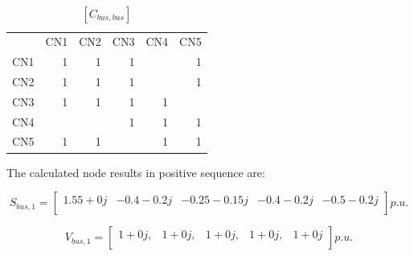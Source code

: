\documentclass[nols,a4paper,twoside,notoc,fleqn]{tufte-book}
\begin{document}
\begin{table}[h!]
	\begin{tabular}{lrrrrr}
		{} &  CN1 &  CN2 &  CN3 &  CN4 &  CN5 \\
		CN1 &    1 &    1 &    1 &      &    1 \\
		CN2 &    1 &    1 &    1 &      &    1 \\
		CN3 &    1 &    1 &    1 &    1 &      \\
		CN4 &      &      &    1 &    1 &    1 \\
		CN5 &    1 &    1 &      &    1 &    1 \\
	\end{tabular}
\caption{$[C_{bus, bus}]$}
\end{table}





The calculated node results in positive sequence are:
%

$$
S_{bus,1} = \left[ \begin{array}{ccccc}
1.55+0  j & -0.4 -0.2 j & -0.25-0.15j & -0.4 -0.2 j & -0.5 -0.2 j\\
\end{array} \right] p.u.
$$

$$
V_{bus,1} = \left[ \begin{array}{ccccc}
1+0j, & 1+0j,  & 1+0j, & 1+0j,  & 1+0j \\
\end{array} \right] p.u.
$$
\end{document}
